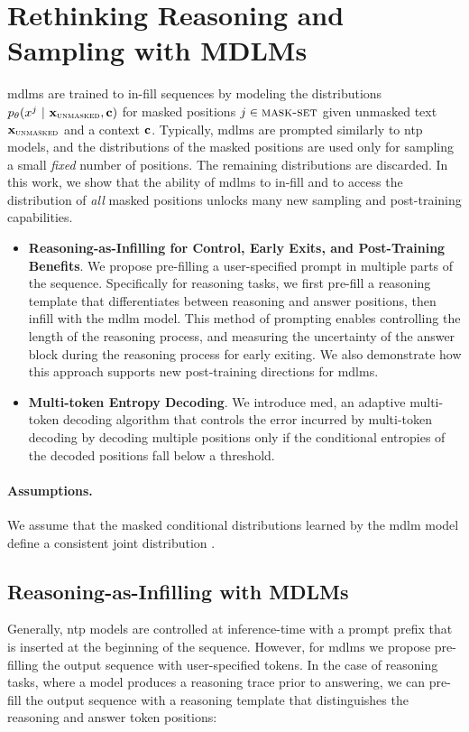\section{Rethinking Reasoning and Sampling with MDLMs}
\glspl{mdlm} are trained to in-fill sequences by modeling the distributions $p_\theta(x^j ~\vert~ \mathbf{x}_\textsc{unmasked}, \mathbf{c})$ for masked positions $j \in \textsc{mask-set}$ given unmasked text $\mathbf{x}_\textsc{unmasked}$ and a context $\mathbf{c}$.  Typically, \glspl{mdlm} are prompted similarly to \gls{ntp} models, and the distributions of the masked positions are used only for sampling a small \textit{fixed} number of positions. The remaining distributions are discarded.
In this work, we show that the ability of \glspl{mdlm} to in-fill and to access the distribution of \textit{all} masked positions
unlocks many new sampling and post-training capabilities. 


\begin{itemize}[leftmargin=*]
    \item \textbf{Reasoning-as-Infilling for Control, Early Exits, and Post-Training Benefits}. We propose pre-filling a user-specified prompt in multiple parts of the sequence. Specifically for reasoning tasks, we first pre-fill a reasoning template that differentiates between reasoning and answer positions, then infill with the \gls{mdlm} model. This method of prompting enables controlling the length of the reasoning process, and measuring the uncertainty of the answer block during the reasoning process for early exiting. We also demonstrate how this approach supports new post-training directions for \glspl{mdlm}.
    \item \textbf{Multi-token Entropy Decoding}. We introduce \gls{med}, an adaptive multi-token decoding algorithm that controls the error incurred by multi-token decoding by decoding multiple positions only if the conditional entropies of the decoded positions fall below a threshold.     
\end{itemize}

\paragraph{Assumptions.} We assume that the masked conditional distributions learned by the \gls{mdlm} model define a consistent joint distribution \citep{majid2025consistent}.








\subsection{Reasoning-as-Infilling with MDLMs}
Generally, \gls{ntp} models are controlled at inference-time with a prompt prefix that is inserted at the beginning of the sequence. However, for \glspl{mdlm} we propose pre-filling the output sequence with user-specified tokens. In the case of reasoning tasks, where a model produces a reasoning trace prior to answering, we can pre-fill the output sequence with a reasoning template that distinguishes the reasoning and answer token positions:


